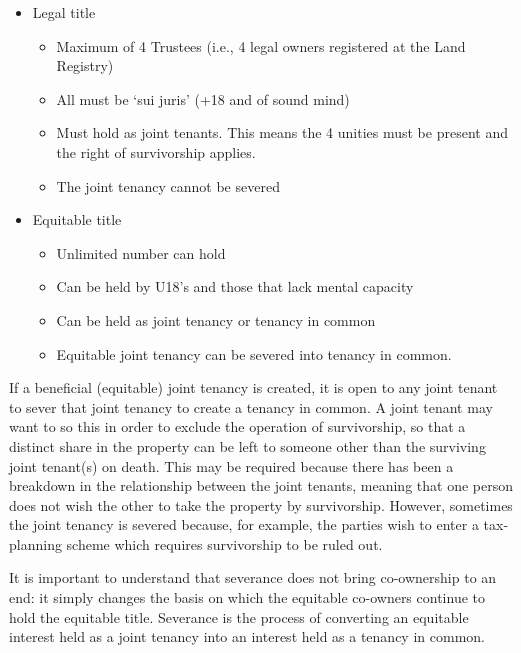 \documentclass[
]{article}
\providecommand{\tightlist}{%
  \setlength{\itemsep}{0pt}\setlength{\parskip}{0pt}}
\begin{document}
\begin{itemize}
\tightlist
\item
  Legal title

  \begin{itemize}
  \tightlist
  \item
    Maximum of 4 Trustees (i.e., 4 legal owners registered at the Land
    Registry)
  \item
    All must be `sui juris' (+18 and of sound mind)
  \item
    Must hold as joint tenants. This means the 4 unities must be present
    and the right of survivorship applies.
  \item
    The joint tenancy cannot be severed
  \end{itemize}
\item
  Equitable title

  \begin{itemize}
  \tightlist
  \item
    Unlimited number can hold
  \item
    Can be held by U18's and those that lack mental capacity
  \item
    Can be held as joint tenancy or tenancy in common
  \item
    Equitable joint tenancy can be severed into tenancy in common.
  \end{itemize}
\end{itemize}

If a beneficial (equitable) joint tenancy is created, it is open to any
joint tenant to sever that joint tenancy to create a tenancy in common.
A joint tenant may want to so this in order to exclude the operation of
survivorship, so that a distinct share in the property can be left to
someone other than the surviving joint tenant(s) on death. This may be
required because there has been a breakdown in the relationship between
the joint tenants, meaning that one person does not wish the other to
take the property by survivorship. However, sometimes the joint tenancy
is severed because, for example, the parties wish to enter a
tax-planning scheme which requires survivorship to be ruled out.

It is important to understand that severance does not bring co-ownership
to an end: it simply changes the basis on which the equitable co-owners
continue to hold the equitable title. Severance is the process of
converting an equitable interest held as a joint tenancy into an
interest held as a tenancy in common.
\end{document}
